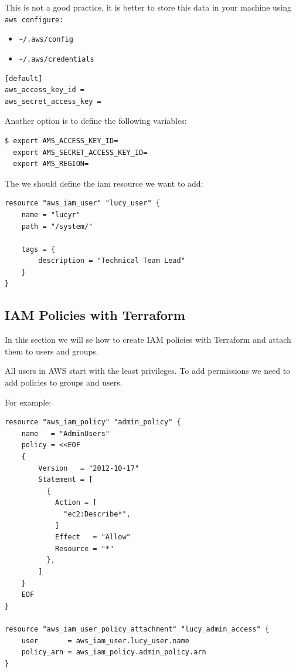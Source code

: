 \documentclass{article}
\newenvironment{blocktemplateII}[1]{%
    \tcolorbox[beamer,%
    noparskip,breakable,
    colframe=Green,%
    colbacklower=LimeGreen!75!LightGreen,%
    title=#1]}%
    {\endtcolorbox}
\newenvironment{blocktemplateIII}[1]{%
    \tcolorbox[beamer,%
    noparskip,breakable,
    ,colframe=Red,%
    colbacklower=LimeGreen!75!LightGreen,%
    title=#1]}%
    {\endtcolorbox}
\newenvironment{codetemplate}[1][]{%
  \mybasecolorbox[#1]
  \itshape
}{%
  \endmybasecolorbox
}
\begin{document}
\begin{blocktemplateIII}{WARNING}
This is not a good practice, it is better to store this data in your machine using \verb+aws configure:+
\begin{itemize}
    \item \verb+~/.aws/config+
    \item \verb+~/.aws/credentials+
\end{itemize}
\begin{codetemplate}{}
\begin{verbatim}
[default]
aws_access_key_id =
aws_secret_access_key =
\end{verbatim}
\end{codetemplate}

Another option is to define the following variables:
\begin{codetemplate}{}
\begin{verbatim}
$ export AMS_ACCESS_KEY_ID=
  export AMS_SECRET_ACCESS_KEY_ID=
  export AMS_REGION=
\end{verbatim}
\end{codetemplate}

\end{blocktemplateIII}

The we should define the iam resource we want to add:
\begin{codetemplate}{}
\begin{verbatim}
resource "aws_iam_user" "lucy_user" {
    name = "lucyr"
    path = "/system/"
    
    tags = {
        description = "Technical Team Lead"
    }
}
\end{verbatim}
\end{codetemplate}

\subsection{IAM Policies with Terraform}
In this section we will se how to create IAM policies with Terraform and attach them to users and groups.

\begin{blocktemplateII}{Note}
All users in AWS start with the least privileges. To add permissions we need to add policies to groups and users.
\end{blocktemplateII}

For example:

\begin{codetemplate}{}
\begin{verbatim}
resource "aws_iam_policy" "admin_policy" {
    name   = "AdminUsers"
    policy = <<EOF
    {
        Version   = "2012-10-17"
        Statement = [
          {
            Action = [
              "ec2:Describe*",
            ]
            Effect   = "Allow"
            Resource = "*"
          },
        ]
    }
    EOF
}

resource "aws_iam_user_policy_attachment" "lucy_admin_access" {
    user       = aws_iam_user.lucy_user.name
    policy_arn = aws_iam_policy.admin_policy.arn
}
\end{verbatim}
\end{codetemplate}
\end{document}
